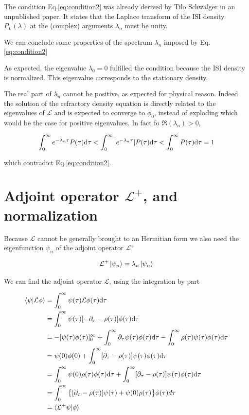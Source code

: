 \documentclass[12pt,twoside]{report}
\def \dd  {{\rm d}}
\begin{document}
The condition Eq.\eqref{eq:condition2} was already derived by Tilo Schwalger in an unpublished paper. It states that the Laplace transform of the ISI density $P_L(\lambda)$ at the (complex) arguments $\lambda_{n}$ must be unity. 

We can conclude some properties of the spectrum {$\lambda_n$} imposed by Eq.\eqref{eq:condition2}

As expected, the eigenvalue $\lambda_0=0$ fulfilled the condition because the ISI density is normalized. This eigenvalue corresponds to the stationary density.

The real part of $\lambda_n$ cannot be positive, as expected for physical reason. Indeed the solution of the refractory density equation is directly related to the eigenvalues of $\mathcal{L}$ and is expected to converge to $\phi_0$, instead of exploding which would be the case for positive eigenvalues. In fact fo $\Re(\lambda_n)>0$,

\begin{equation}
\int_0^\infty e^{-\lambda_n \tau} P(\tau) \dd\tau<\int_0^\infty |e^{-\lambda_n\tau} |P(\tau) \dd\tau<\int_0^\infty P(\tau) \dd\tau=1
\end{equation}

which contradict Eq.\eqref{eq:condition2}.



\section{Adjoint operator $\mathcal{L}^+$, and normalization}

Because $\mathcal{L}$ cannot be generally brought to an Hermitian form we also need  the eigenfunction $\psi_n$ of the adjoint operator  $\mathcal{L}^{+}$

\begin{equation}
\label{eq:Ldegaoperator}
\mathcal{L}^+\ket{\psi_n}=\lambda_n\ket{\psi_n}
\end{equation}

We can find the adjoint operator $\mathcal{L}$, using the integration by part

\begin{align}
\langle\psi|\mathcal{L}\phi\rangle&= \int_{0}^{\infty}\psi(\tau)\mathcal{L}\phi(\tau)\dd\tau  \nonumber \\
&= \int_{0}^{\infty}\psi(\tau)[-\partial_{\tau}-\rho(\tau)]\phi(\tau)\dd\tau  \nonumber \\
&=-[\psi(\tau)\phi(\tau)]^{\infty}_{0}+\int_{0}^{\infty}\partial_{\tau}\psi(\tau)\phi(\tau)\dd\tau -\int_{0}^{\infty}\rho(\tau)\psi(\tau)\phi(\tau)\dd\tau \nonumber \\
&= \psi(0)\phi(0)+ \int_{0}^{\infty}[\partial_{\tau}-\rho(\tau)]\psi(\tau)\phi(\tau)\dd\tau  \nonumber \\
&=\int_{0}^{\infty} \psi(0)\rho(\tau)\phi(\tau)\dd\tau+ \int_{0}^{\infty}[\partial_{\tau}-\rho(\tau)]\psi(\tau)\phi(\tau)\dd\tau  \nonumber \\
&= \int_{0}^{\infty}\big\{[\partial_{\tau}-\rho(\tau)]\psi(\tau)+ \psi(0)\rho(\tau)\big\}\phi(\tau)d\tau  \nonumber \\
& = \langle\mathcal{L}^+\psi|\phi\rangle
\end{align}
\end{document}
